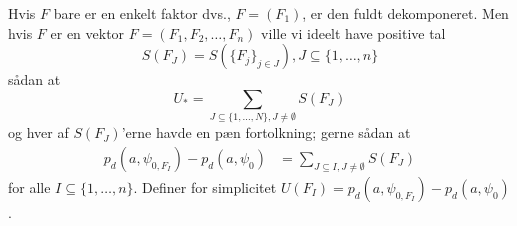 \documentclass[a4paper, 12pt]{memoir}
\begin{document}
Hvis $F$ bare er en enkelt faktor dvs., $F=(F_1)$, er den fuldt dekomponeret. Men hvis $F$ er en vektor $F=(F_1, F_2, \dots, F_n)$ ville vi ideelt have positive tal 
\begin{equation*}
S(F_J)=S(\{F_j\}_{j\in J}), J\subseteq \{1, \dots, n\}
\end{equation*}
sådan at
\begin{equation}
U_*=\sum_{J\subseteq \{1, \dots, N\}, J\neq \emptyset}S(F_J)
\end{equation}
og hver af $S(F_J)$'erne havde en pæn fortolkning; gerne sådan at 
\begin{align}
p_d(a,\psi_{0,F_I})-p_d(a, \psi_0)&=\sum_{J\subseteq I, J\neq \emptyset} S(F_J)\label{decomp}
\end{align}
for alle $I\subseteq \{1, \dots, n\}$. Definer for simplicitet $U(F_I)=p_d(a,\psi_{0,F_I})-p_d(a, \psi_0)$.
%
%
%
\end{document}
